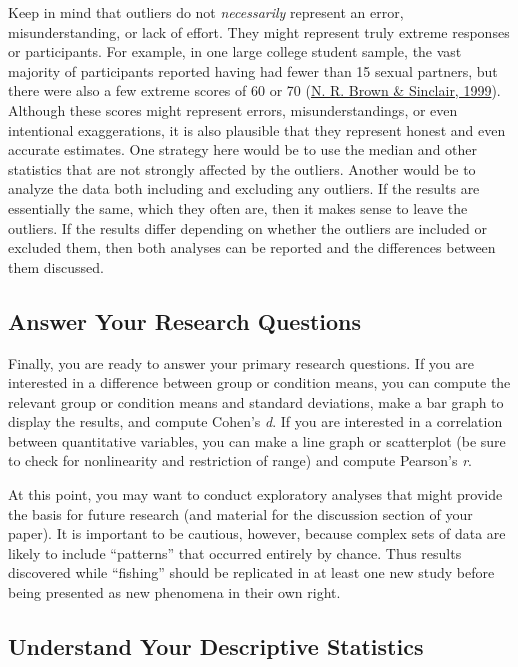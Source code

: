 \documentclass[
]{krantz}
\begin{document}
Keep in mind that outliers do not \emph{necessarily} represent an error, misunderstanding, or lack of effort. They might represent truly extreme responses or participants. For example, in one large college student sample, the vast majority of participants reported having had fewer than 15 sexual partners, but there were also a few extreme scores of 60 or 70 (\protect\hyperlink{ref-brown1999estimating}{N. R. Brown \& Sinclair, 1999}). Although these scores might represent errors, misunderstandings, or even intentional exaggerations, it is also plausible that they represent honest and even accurate estimates. One strategy here would be to use the median and other statistics that are not strongly affected by the outliers. Another would be to analyze the data both including and excluding any outliers. If the results are essentially the same, which they often are, then it makes sense to leave the outliers. If the results differ depending on whether the outliers are included or excluded them, then both analyses can be reported and the differences between them discussed.

\hypertarget{answer-your-research-questions}{%
\subsection*{Answer Your Research Questions}\label{answer-your-research-questions}}


Finally, you are ready to answer your primary research questions. If you are interested in a difference between group or condition means, you can compute the relevant group or condition means and standard deviations, make a bar graph to display the results, and compute Cohen's \emph{d}. If you are interested in a correlation between quantitative variables, you can make a line graph or scatterplot (be sure to check for nonlinearity and restriction of range) and compute Pearson's \emph{r}.

At this point, you may want to conduct exploratory analyses that might provide the basis for future research (and material for the discussion section of your paper). It is important to be cautious, however, because complex sets of data are likely to include ``patterns'' that occurred entirely by chance. Thus results discovered while ``fishing'' should be replicated in at least one new study before being presented as new phenomena in their own right.

\hypertarget{understand-your-descriptive-statistics}{%
\subsection*{Understand Your Descriptive Statistics}\label{understand-your-descriptive-statistics}}
\end{document}
